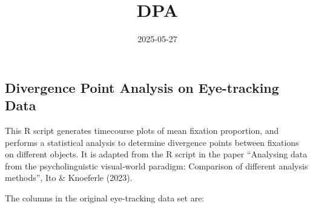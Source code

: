 \documentclass[
]{article}
\title{DPA}
\author{}
\date{\vspace{-2.5em}2025-05-27}
\begin{document}
\maketitle

\subsection{Divergence Point Analysis on Eye-tracking
Data}\label{divergence-point-analysis-on-eye-tracking-data}

This R script generates timecourse plots of mean fixation proportion,
and performs a statistical analysis to determine divergence points
between fixations on different objects. It is adapted from the R script
in the paper ``Analysing data from the psycholinguistic visual‑world
paradigm: Comparison of different analysis methods'', Ito \& Knoeferle
(2023).

The columns in the original eye-tracking data set are:
\end{document}
